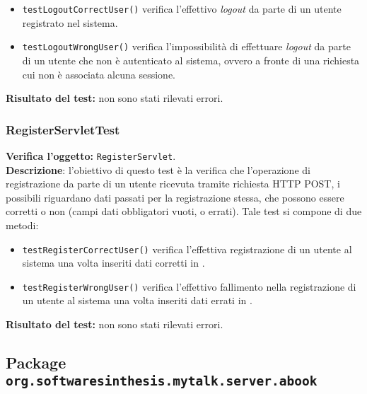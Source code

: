 \begin{itemize}
\item \texttt{testLogoutCorrectUser()}  verifica l'effettivo \textit{logout} da parte di un utente registrato nel sistema.
\item \texttt{testLogoutWrongUser()} verifica l'impossibilità di effettuare \textit{logout} da parte di un utente che non è autenticato al sistema, ovvero a fronte di una richiesta cui non è associata alcuna sessione.
\end{itemize}
\textbf{Risultato del test:} non sono stati rilevati errori.

\subsubsection{RegisterServletTest}
\textbf{Verifica l'oggetto:} \texttt{RegisterServlet}.\\
\textbf{Descrizione}: l'obiettivo di questo test è la verifica che l'operazione di registrazione da parte di un utente ricevuta tramite richiesta HTTP POST, i possibili  riguardano dati passati per la registrazione stessa, che possono essere corretti o non (campi dati obbligatori vuoti, o errati).
Tale test si compone di due metodi:
\begin{itemize}
\item \texttt{testRegisterCorrectUser()} verifica l'effettiva registrazione di un utente al sistema una volta inseriti dati corretti in .
\item \texttt{testRegisterWrongUser()}  verifica l'effettivo fallimento nella registrazione di un utente al sistema una volta inseriti dati errati in .
\end{itemize}
\textbf{Risultato del test:} non sono stati rilevati errori.


\subsection{Package \texttt{org.softwaresinthesis.mytalk.server.abook}}

